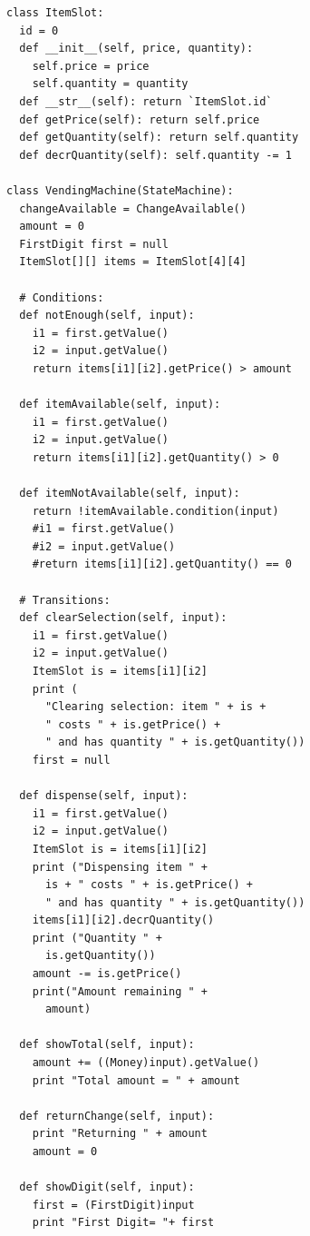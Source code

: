 \documentclass{article}
\begin{document}
\begin{lstlisting}
class ItemSlot: 
  id = 0 
  def __init__(self, price, quantity): 
    self.price = price 
    self.quantity = quantity 
  def __str__(self): return `ItemSlot.id` 
  def getPrice(self): return self.price  
  def getQuantity(self): return self.quantity  
  def decrQuantity(self): self.quantity -= 1 
  
class VendingMachine(StateMachine): 
  changeAvailable = ChangeAvailable() 
  amount = 0 
  FirstDigit first = null 
  ItemSlot[][] items = ItemSlot[4][4] 
  
  # Conditions: 
  def notEnough(self, input): 
    i1 = first.getValue() 
    i2 = input.getValue() 
    return items[i1][i2].getPrice() > amount 
    
  def itemAvailable(self, input): 
    i1 = first.getValue() 
    i2 = input.getValue() 
    return items[i1][i2].getQuantity() > 0 
    
  def itemNotAvailable(self, input): 
    return !itemAvailable.condition(input) 
    #i1 = first.getValue() 
    #i2 = input.getValue() 
    #return items[i1][i2].getQuantity() == 0 
    
  # Transitions: 
  def clearSelection(self, input): 
    i1 = first.getValue() 
    i2 = input.getValue() 
    ItemSlot is = items[i1][i2] 
    print ( 
      "Clearing selection: item " + is + 
      " costs " + is.getPrice() + 
      " and has quantity " + is.getQuantity()) 
    first = null 
    
  def dispense(self, input): 
    i1 = first.getValue() 
    i2 = input.getValue() 
    ItemSlot is = items[i1][i2] 
    print ("Dispensing item " +  
      is + " costs " + is.getPrice() + 
      " and has quantity " + is.getQuantity()) 
    items[i1][i2].decrQuantity() 
    print ("Quantity " +  
      is.getQuantity()) 
    amount -= is.getPrice() 
    print("Amount remaining " +  
      amount) 
      
  def showTotal(self, input): 
    amount += ((Money)input).getValue() 
    print "Total amount = " + amount 
    
  def returnChange(self, input): 
    print "Returning " + amount 
    amount = 0 
    
  def showDigit(self, input): 
    first = (FirstDigit)input 
    print "First Digit= "+ first 
    

\end{lstlisting}
\end{document}
